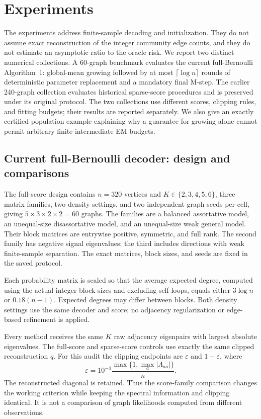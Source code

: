 \documentclass[11pt]{article}
\theoremstyle{definition}
\theoremstyle{remark}
\numberwithin{equation}{section}
\begin{document}
\section{Experiments}
\label{sec:experiments}
The experiments address finite-sample decoding and initialization. They do not assume exact reconstruction of the integer community edge counts, and they do not estimate an asymptotic ratio to the oracle risk. We report two distinct numerical collections. A 60-graph benchmark evaluates
the current full-Bernoulli Algorithm~1: global-mean growing followed by
at most $\lceil\log n\rceil$ rounds of deterministic parameter replacement
and a mandatory final M-step. The earlier 240-graph collection evaluates
historical sparse-score procedures and is preserved under its original
protocol. The two collections use different scores, clipping rules, and
fitting budgets; their results are reported separately. We also give an
exactly certified population example explaining why a guarantee for growing
alone cannot permit arbitrary finite intermediate EM budgets.

\subsection{Current full-Bernoulli decoder: design and comparisons}
The full-score design contains $n=320$ vertices and
$K\in\{2,3,4,5,6\}$, three matrix families, two density settings, and two
independent graph seeds per cell, giving $5\times3\times2\times2=60$ graphs.
The families are a balanced assortative model, an unequal-size
disassortative model, and an unequal-size weak general model. Their block
matrices are entrywise positive, symmetric, and full rank. The second family
has negative signal eigenvalues; the third includes directions with weak
finite-sample separation. The exact matrices, block sizes, and seeds are
fixed in the saved protocol.

Each probability matrix is scaled so that the average expected degree,
computed using the actual integer block sizes and excluding self-loops,
equals either $3\log n$ or $0.18(n-1)$. Expected degrees may differ between
blocks. Both density settings use the same decoder and score; no adjacency
regularization or edge-based refinement is applied.

Every method receives the same $K$ raw adjacency eigenpairs with largest
absolute eigenvalues. The full-score and sparse-score controls use exactly
the same clipped reconstruction $q$. For this audit the clipping endpoints
are $\varepsilon$ and $1-\varepsilon$, where
\[
 \varepsilon=10^{-4}\frac{\max\{1,\max_a|\Lambda_{aa}|\}}n.
\]
The reconstructed diagonal is retained. Thus the score-family comparison
changes the working criterion while keeping the spectral information and
clipping identical. It is not a comparison of graph likelihoods computed
from different observations.
\end{document}
